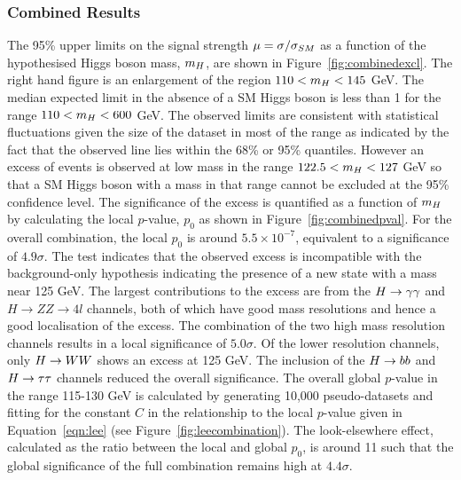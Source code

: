\subsubsection{Combined Results}
\label{sec:combinedsearchresults}
The 95\% upper limits on the signal strength $\mu=\sigma/\sigma_{SM}$ as a function 
of the hypothesised Higgs boson mass, $m_{H}$, are shown in 
Figure~\ref{fig:combinedexcl}. The right hand figure is an enlargement of
the region $110 < m_{H}  < 145$ GeV. The median expected limit in the absence
of a SM Higgs boson is less than 1 for the range $110< m_{H}<600$ GeV. 
The observed limits are consistent with statistical fluctuations given the 
size of the dataset in most of the range as indicated by the fact that the 
observed line lies within the 68\% or 95\% quantiles. However an
excess of events is observed at low mass in the range $122.5  < m_{H} < 127$ GeV
so that a SM Higgs boson with a mass in that range cannot be excluded
at the 95\% confidence level. The significance of the excess is quantified as a function
of $m_{H}$ by calculating the local $p$-value, $p_{0}$ as shown in Figure~\ref{fig:combinedpval}. 
For the overall combination, the local $p_{0}$ is around $5.5\times10^{-7}$, 
equivalent to a significance of $4.9\sigma$. The test indicates that the observed excess 
is incompatible with the background-only hypothesis indicating the presence of 
a new state with a mass near 125 GeV.
The largest contributions to the excess are
from the $H\rightarrow\gamma\gamma$ and $H\rightarrow ZZ\rightarrow4l$ channels, 
both of which have good mass resolutions and hence a good localisation
of the excess. The combination of the two 
high mass resolution channels results in a local significance of $5.0\sigma$. 
Of the lower resolution channels, only $H\rightarrow WW$ shows an excess at 125 GeV. The inclusion
of the $H\rightarrow bb$ and $H\rightarrow\tau\tau$ channels reduced the overall significance.
The overall global $p$-value in the range 115-130 GeV is calculated by 
generating 10,000 pseudo-datasets and fitting for the constant $C$ in 
the relationship to the local $p$-value given in Equation~\ref{eqn:lee} 
(see Figure~\ref{fig:leecombination}). The
look-elsewhere effect, calculated as the ratio between the local and global $p_{0}$, 
is around 11 such that the global significance of the full combination remains high at $4.4\sigma$.

